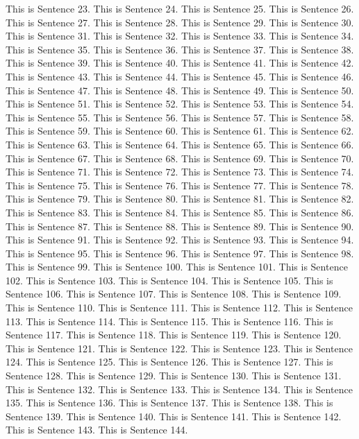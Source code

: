 \documentclass{article}
\begin{document}
This is Sentence 23.
This is Sentence 24.
This is Sentence 25.
This is Sentence 26.
This is Sentence 27.
This is Sentence 28.
This is Sentence 29.
This is Sentence 30.
This is Sentence 31.
This is Sentence 32.
This is Sentence 33.
This is Sentence 34.
This is Sentence 35.
This is Sentence 36.
This is Sentence 37.
This is Sentence 38.
This is Sentence 39.
This is Sentence 40.
This is Sentence 41.
This is Sentence 42.
This is Sentence 43.
This is Sentence 44.
This is Sentence 45.
This is Sentence 46.
This is Sentence 47.
This is Sentence 48.
This is Sentence 49.
This is Sentence 50.
This is Sentence 51.
This is Sentence 52.
This is Sentence 53.
This is Sentence 54.
This is Sentence 55.
This is Sentence 56.
This is Sentence 57.
This is Sentence 58.
This is Sentence 59.
This is Sentence 60.
This is Sentence 61.
This is Sentence 62.
This is Sentence 63.
This is Sentence 64.
This is Sentence 65.
This is Sentence 66.
This is Sentence 67.
This is Sentence 68.
This is Sentence 69.
This is Sentence 70.
This is Sentence 71.
This is Sentence 72.
This is Sentence 73.
This is Sentence 74.
This is Sentence 75.
This is Sentence 76.
This is Sentence 77.
This is Sentence 78.
This is Sentence 79.
This is Sentence 80.
This is Sentence 81.
This is Sentence 82.
This is Sentence 83.
This is Sentence 84.
This is Sentence 85.
This is Sentence 86.
This is Sentence 87.
This is Sentence 88.
This is Sentence 89.
This is Sentence 90.
This is Sentence 91.
This is Sentence 92.
This is Sentence 93.
This is Sentence 94.
This is Sentence 95.
This is Sentence 96.
This is Sentence 97.
This is Sentence 98.
This is Sentence 99.
This is Sentence 100.
This is Sentence 101.
This is Sentence 102.
This is Sentence 103.
This is Sentence 104.
This is Sentence 105.
This is Sentence 106.
This is Sentence 107.
This is Sentence 108.
This is Sentence 109.
This is Sentence 110.
This is Sentence 111.
This is Sentence 112.
This is Sentence 113.
This is Sentence 114.
This is Sentence 115.
This is Sentence 116.
This is Sentence 117.
This is Sentence 118.
This is Sentence 119.
This is Sentence 120.
This is Sentence 121.
This is Sentence 122.
This is Sentence 123.
This is Sentence 124.
This is Sentence 125.
This is Sentence 126.
This is Sentence 127.
This is Sentence 128.
This is Sentence 129.
This is Sentence 130.
This is Sentence 131.
This is Sentence 132.
This is Sentence 133.
This is Sentence 134.
This is Sentence 135.
This is Sentence 136.
This is Sentence 137.
This is Sentence 138.
This is Sentence 139.
This is Sentence 140.
This is Sentence 141.
This is Sentence 142.
This is Sentence 143.
This is Sentence 144.
\end{document}
